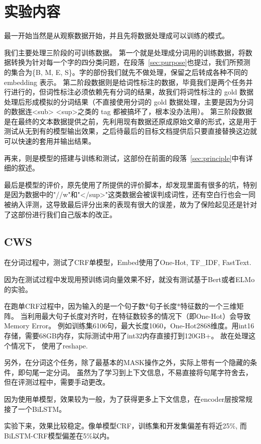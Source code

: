 \section{实验内容}
\label{sec:experiment}

最一开始当然是从观察数据开始，并且先将数据处理成可以训练的模式。

我们主要处理三阶段的可训练数据。
第一个就是处理成分词用的训练数据，将数据转换为针对每一个字的四分类问题，在段落~\ref{sec:purpose}也提过，我们所预测的集合为\{B, M, E, S\}。字的部份我们就先不做处理，保留之后转成各种不同的 embedding 表示。
第二阶段数据则是给词性标注的数据，毕竟我们是两个任务并行进行的，但词性标注必须依赖先有分词的结果，故我们将词性标注的 gold 数据处理后形成模拟的分词结果（不直接使用分词的 gold 数据处理，主要是因为分词的数据连<sub> <sup>之类的 tag 都被搞坏了，根本没办法用）。
第三阶段数据是在最终的文本数据提供之前，先利用现有数据还原成原始文章的形式，这是用于测试从无到有的模型输出效果，之后待最后的目标文档提供后只要直接替换这边就可以快速的套用并输出结果。

再来，则是模型的搭建与训练和测试，这部份在前面的段落~\ref{sec:principle}中有详细的叙述。

最后是模型的评价，原先使用了所提供的评价脚本，却发现里面有很多的坑，特别是因为数据中的"//w"和"</sup>"这类数据会被误判成词性，还有空白行也会一同被纳入评测，这导致最后评分出来的表现有很大的误差，故为了保险起见还是针对了这部份进行我们自己版本的改正。

\subsection*{CWS}

在分词过程中，测试了CRF单模型，Embed使用了One-Hot, TF\_IDF, FastText.

因为在测试过程中发现用预训练词向量效果不好，就没有测试基于Bert或者ELMo的实验。

在跑单CRF过程中，因为输入的是一个句子数*句子长度*特征数的一个三维矩阵。
当利用最大句子长度对齐时，在特征数较多的情况下（即One-Hot）会导致Memory Error。
例如训练集6106句，最大长度1060，One-Hot2868维度。用int16存储，需要68GB内存，实际测试中用了int32内存直接打到120GB+。
故在处理这个情况下， 使用了reshape.

另外，在分词这个任务，除了最基本的MASK操作之外，实际上带有一个隐藏的条件，即句尾一定分词。
虽然为了学习到上下文信息，不易直接将句尾字符舍去，但在评测过程中，需要手动更改。

因为使用单模型，效果较为一般，为了获得更多上下文信息，在encoder层按常规接了一个BiLSTM。

实验下来，效果比较稳定。像单模型CRF，训练集和开发集偏差有将近25\%, 而BiLSTM-CRF模型偏差在5\%以内。